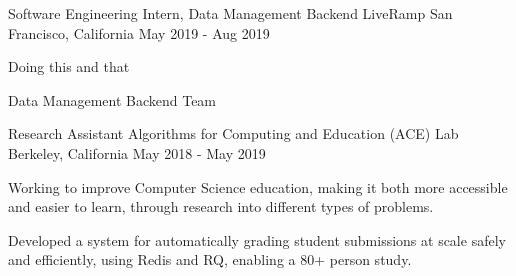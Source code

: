 

\begin{cventries}

    \cventry
      {Software Engineering Intern, Data Management Backend}
      {LiveRamp}
      {San Francisco, California}
      {May 2019 - Aug 2019}
      {
        \begin{cvitems}
          \item Doing this and that
          \item Data Management Backend Team
        \end{cvitems}
      }

    \cventry
      {Research Assistant}
      {Algorithms for Computing and Education (ACE) Lab}
      {Berkeley, California}
      {May 2018 - May 2019}
      {
        \begin{cvitems}
          \item Working to improve Computer Science education, making it both more accessible and easier to learn, through research into different types of problems.
          \item Developed a system for automatically grading student submissions at scale safely and efficiently, using Redis and RQ, enabling a 80+ person study. 
        \end{cvitems}  
      }

\end{cventries}
